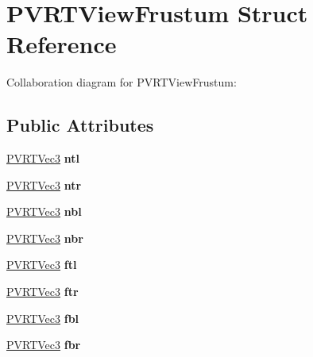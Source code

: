 \hypertarget{struct_p_v_r_t_view_frustum}{\section{P\+V\+R\+T\+View\+Frustum Struct Reference}
\label{struct_p_v_r_t_view_frustum}
}


Collaboration diagram for P\+V\+R\+T\+View\+Frustum\+:
\subsection*{Public Attributes}
\begin{DoxyCompactItemize}
\item 
\hypertarget{struct_p_v_r_t_view_frustum_a74df55269367cbb588746072678cb7c1}{\hyperlink{struct_p_v_r_t_vec3}{P\+V\+R\+T\+Vec3} {\bfseries ntl}}\label{struct_p_v_r_t_view_frustum_a74df55269367cbb588746072678cb7c1}

\item 
\hypertarget{struct_p_v_r_t_view_frustum_aeea1a410841cffe02c5f9aa6c6ea32ef}{\hyperlink{struct_p_v_r_t_vec3}{P\+V\+R\+T\+Vec3} {\bfseries ntr}}\label{struct_p_v_r_t_view_frustum_aeea1a410841cffe02c5f9aa6c6ea32ef}

\item 
\hypertarget{struct_p_v_r_t_view_frustum_a1e1d8eacb32edf51cb89ee42101e20f3}{\hyperlink{struct_p_v_r_t_vec3}{P\+V\+R\+T\+Vec3} {\bfseries nbl}}\label{struct_p_v_r_t_view_frustum_a1e1d8eacb32edf51cb89ee42101e20f3}

\item 
\hypertarget{struct_p_v_r_t_view_frustum_a0d84772f1fb4d527a82ab01bd3ce428e}{\hyperlink{struct_p_v_r_t_vec3}{P\+V\+R\+T\+Vec3} {\bfseries nbr}}\label{struct_p_v_r_t_view_frustum_a0d84772f1fb4d527a82ab01bd3ce428e}

\item 
\hypertarget{struct_p_v_r_t_view_frustum_aa22d54686f16311e895d0d40d736e9c0}{\hyperlink{struct_p_v_r_t_vec3}{P\+V\+R\+T\+Vec3} {\bfseries ftl}}\label{struct_p_v_r_t_view_frustum_aa22d54686f16311e895d0d40d736e9c0}

\item 
\hypertarget{struct_p_v_r_t_view_frustum_a571cd5bce76584712677ab5483cfea5b}{\hyperlink{struct_p_v_r_t_vec3}{P\+V\+R\+T\+Vec3} {\bfseries ftr}}\label{struct_p_v_r_t_view_frustum_a571cd5bce76584712677ab5483cfea5b}

\item 
\hypertarget{struct_p_v_r_t_view_frustum_a03c01f03584dfc22bcbe7a65f1122c59}{\hyperlink{struct_p_v_r_t_vec3}{P\+V\+R\+T\+Vec3} {\bfseries fbl}}\label{struct_p_v_r_t_view_frustum_a03c01f03584dfc22bcbe7a65f1122c59}

\item 
\hypertarget{struct_p_v_r_t_view_frustum_a137ef2f83d18282c524f570061c9cfc3}{\hyperlink{struct_p_v_r_t_vec3}{P\+V\+R\+T\+Vec3} {\bfseries fbr}}\label{struct_p_v_r_t_view_frustum_a137ef2f83d18282c524f570061c9cfc3}

\end{DoxyCompactItemize}


